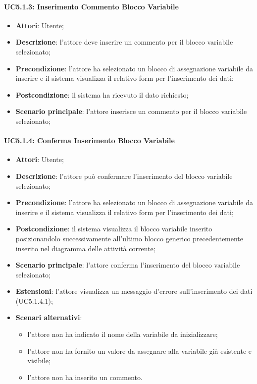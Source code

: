 \paragraph{UC5.1.3: Inserimento Commento Blocco Variabile}
\label{UC5.1.3}
\begin{itemize}
\item \textbf{Attori}: Utente;
\item \textbf{Descrizione}: l'attore deve inserire un commento per il blocco variabile selezionato;	
\item \textbf{Precondizione}: l'attore ha selezionato un blocco di assegnazione variabile da inserire e il sistema visualizza il relativo form per l'inserimento dei dati;
\item \textbf{Postcondizione}: il sistema ha ricevuto il dato richiesto;	
\item \textbf{Scenario principale}:
l'attore inserisce un commento per il blocco variabile selezionato;	
\end{itemize}

\paragraph{UC5.1.4: Conferma Inserimento Blocco Variabile}
\label{UC5.1.4}
\begin{itemize}
\item \textbf{Attori}: Utente;
\item \textbf{Descrizione}: l'attore può confermare l'inserimento del blocco variabile selezionato;	
\item \textbf{Precondizione}: l'attore ha selezionato un blocco di assegnazione variabile da inserire e il sistema visualizza il relativo form per l'inserimento dei dati;
\item \textbf{Postcondizione}: il sistema visualizza il blocco variabile inserito posizionandolo successivamente all'ultimo blocco generico precedentemente inserito nel diagramma delle attività corrente;	
\item \textbf{Scenario principale}:
l'attore conferma l'inserimento del blocco variabile selezionato;	
\item \textbf{Estensioni}:
l'attore visualizza un messaggio d'errore sull'inserimento dei dati (UC5.1.4.1);	
\item \textbf{Scenari alternativi}:
\begin{itemize}
\item l'attore non ha indicato il nome della variabile da inizializzare;
\item l'attore non ha fornito un valore da assegnare alla variabile già esistente e visibile;
\item l'attore non ha inserito un commento.	
\end{itemize}
\end{itemize}

